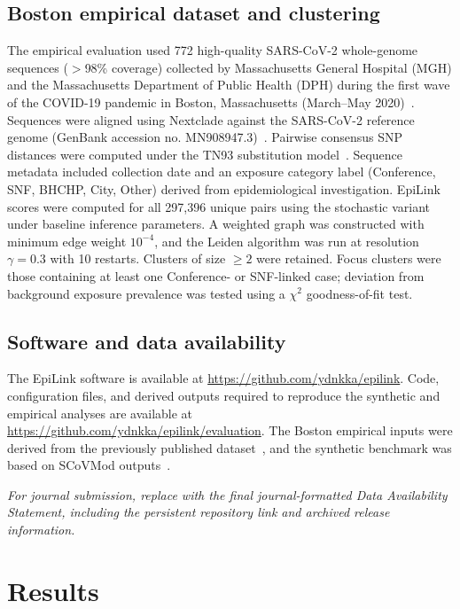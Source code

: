 \documentclass[10pt,letterpaper]{article}
\begin{document}
\subsection*{Boston empirical dataset and clustering}

The empirical evaluation used 772 high-quality SARS-CoV-2 whole-genome sequences ($>$98\% coverage) collected by Massachusetts General Hospital (MGH) and the Massachusetts Department of Public Health (DPH) during the first wave of the COVID-19 pandemic in Boston, Massachusetts (March--May 2020)~\cite{Lemieux2021}. Sequences were aligned using Nextclade against the SARS-CoV-2 reference genome (GenBank accession no. MN908947.3)~\cite{Aksamentov2021}. Pairwise consensus SNP distances were computed under the TN93 substitution model~\cite{TamuraNei1993}. Sequence metadata included collection date and an exposure category label (Conference, SNF, BHCHP, City, Other) derived from epidemiological investigation. EpiLink scores were computed for all 297{,}396 unique pairs using the stochastic variant under baseline inference parameters. A weighted graph was constructed with minimum edge weight $10^{-4}$, and the Leiden algorithm was run at resolution $\gamma = 0.3$ with 10 restarts. Clusters of size $\ge 2$ were retained. Focus clusters were those containing at least one Conference- or SNF-linked case; deviation from background exposure prevalence was tested using a $\chi^2$ goodness-of-fit test.

\subsection*{Software and data availability}

The EpiLink software is available at \url{https://github.com/ydnkka/epilink}. Code, configuration files, and derived outputs required to reproduce the synthetic and empirical analyses are available at \url{https://github.com/ydnkka/epilink/evaluation}. The Boston empirical inputs were derived from the previously published dataset~\cite{Lemieux2021}, and the synthetic benchmark was based on SCoVMod outputs~\cite{Banks2022}.

\textit{For journal submission, replace with the final journal-formatted Data Availability Statement, including the persistent repository link and archived release information.}

\section*{Results}
\end{document}
